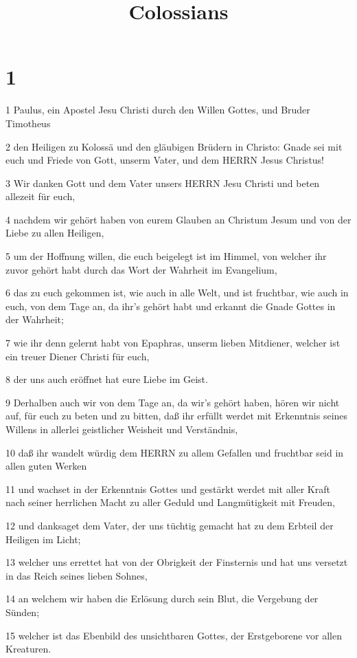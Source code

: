 

\title{Colossians}


\chapter{1}

\par 1 Paulus, ein Apostel Jesu Christi durch den Willen Gottes, und Bruder Timotheus
\par 2 den Heiligen zu Kolossä und den gläubigen Brüdern in Christo: Gnade sei mit euch und Friede von Gott, unserm Vater, und dem HERRN Jesus Christus!
\par 3 Wir danken Gott und dem Vater unsers HERRN Jesu Christi und beten allezeit für euch,
\par 4 nachdem wir gehört haben von eurem Glauben an Christum Jesum und von der Liebe zu allen Heiligen,
\par 5 um der Hoffnung willen, die euch beigelegt ist im Himmel, von welcher ihr zuvor gehört habt durch das Wort der Wahrheit im Evangelium,
\par 6 das zu euch gekommen ist, wie auch in alle Welt, und ist fruchtbar, wie auch in euch, von dem Tage an, da ihr's gehört habt und erkannt die Gnade Gottes in der Wahrheit;
\par 7 wie ihr denn gelernt habt von Epaphras, unserm lieben Mitdiener, welcher ist ein treuer Diener Christi für euch,
\par 8 der uns auch eröffnet hat eure Liebe im Geist.
\par 9 Derhalben auch wir von dem Tage an, da wir's gehört haben, hören wir nicht auf, für euch zu beten und zu bitten, daß ihr erfüllt werdet mit Erkenntnis seines Willens in allerlei geistlicher Weisheit und Verständnis,
\par 10 daß ihr wandelt würdig dem HERRN zu allem Gefallen und fruchtbar seid in allen guten Werken
\par 11 und wachset in der Erkenntnis Gottes und gestärkt werdet mit aller Kraft nach seiner herrlichen Macht zu aller Geduld und Langmütigkeit mit Freuden,
\par 12 und danksaget dem Vater, der uns tüchtig gemacht hat zu dem Erbteil der Heiligen im Licht;
\par 13 welcher uns errettet hat von der Obrigkeit der Finsternis und hat uns versetzt in das Reich seines lieben Sohnes,
\par 14 an welchem wir haben die Erlösung durch sein Blut, die Vergebung der Sünden;
\par 15 welcher ist das Ebenbild des unsichtbaren Gottes, der Erstgeborene vor allen Kreaturen.
